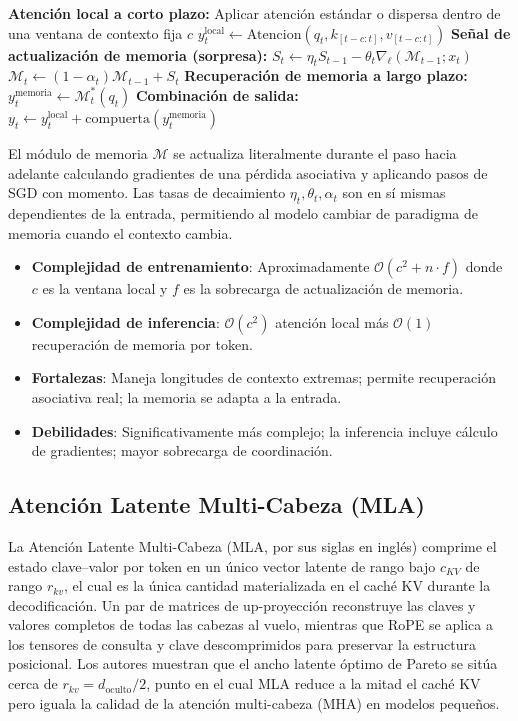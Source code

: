 \begin{algorithmic}[1]
\State \textbf{Atención local a corto plazo:} Aplicar atención estándar o dispersa dentro de una ventana de contexto fija $c$
\State $y_t^{\text{local}} \gets \text{Atencion}(q_t, k_{[t-c:t]}, v_{[t-c:t]})$
\State \textbf{Señal de actualización de memoria (sorpresa):}
\State $S_t \gets \eta_t S_{t-1} - \theta_t \nabla_\ell(\mathcal{M}_{t-1}; x_t)$ 
\State $\mathcal{M}_t \gets (1 - \alpha_t) \mathcal{M}_{t-1} + S_t$ 
\State \textbf{Recuperación de memoria a largo plazo:}
\State $y_t^{\text{memoria}} \gets \mathcal{M}_t^* (q_t)$ 
\State \textbf{Combinación de salida:}
\State $y_t \gets y_t^{\text{local}} + \text{compuerta}(y_t^{\text{memoria}})$ 
\end{algorithmic}

El módulo de memoria $\mathcal{M}$ se actualiza literalmente durante el paso hacia adelante calculando gradientes de una pérdida asociativa y aplicando pasos de SGD con momento. Las tasas de decaimiento $\eta_t, \theta_t, \alpha_t$ son en sí mismas dependientes de la entrada, permitiendo al modelo cambiar de paradigma de memoria cuando el contexto cambia.

\begin{itemize}[leftmargin=*]
    \item \textbf{Complejidad de entrenamiento}: Aproximadamente $\mathcal{O}(c^2 + n \cdot f)$ donde $c$ es la ventana local y $f$ es la sobrecarga de actualización de memoria.
    \item \textbf{Complejidad de inferencia}: $\mathcal{O}(c^2)$ atención local más $\mathcal{O}(1)$ recuperación de memoria por token.
    \item \textbf{Fortalezas}: Maneja longitudes de contexto extremas; permite recuperación asociativa real; la memoria se adapta a la entrada.
    \item \textbf{Debilidades}: Significativamente más complejo; la inferencia incluye cálculo de gradientes; mayor sobrecarga de coordinación.
\end{itemize}

\subsection{Atención Latente Multi-Cabeza (MLA)}
La Atención Latente Multi-Cabeza (MLA, por sus siglas en inglés) \citep{mehta_mla_2025} comprime el estado clave--valor por token en un único vector latente de rango bajo $c_{KV}$ de rango $r_{kv}$, el cual es la única cantidad materializada en el caché KV durante la decodificación. Un par de matrices de up-proyección reconstruye las claves y valores completos de todas las cabezas al vuelo, mientras que RoPE se aplica a los tensores de consulta y clave descomprimidos para preservar la estructura posicional. Los autores muestran que el ancho latente óptimo de Pareto se sitúa cerca de $r_{kv} = d_{\text{oculto}} / 2$, punto en el cual MLA reduce a la mitad el caché KV pero iguala la calidad de la atención multi-cabeza (MHA) en modelos pequeños.

